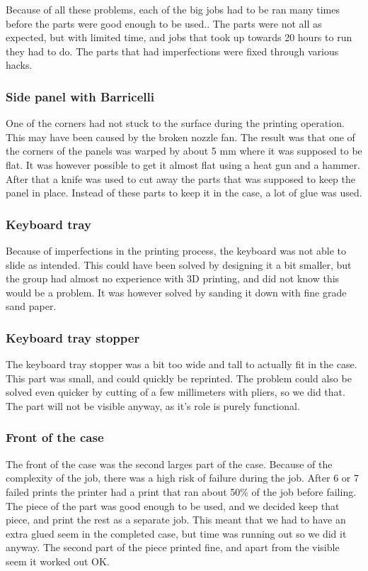 Because of all these problems, each of the big jobs had to be ran many times before the parts were good enough to be used..
The parts were not all as expected, but with limited time, and jobs that took up towards 20 hours to run they had to do.
The parts that had imperfections were fixed through various hacks.

\subsubsection*{Side panel with Barricelli}
One of the corners had not stuck to the surface during the printing operation.
This may have been caused by the broken nozzle fan.
The result was that one of the corners of the panels was warped by about 5 mm where it was supposed to be flat.
It was however possible to get it almost flat using a heat gun and a hammer.
After that a knife was used to cut away the parts that was supposed to keep the panel in place.
Instead of these parts to keep it in the case, a lot of glue was used.

\subsubsection*{Keyboard tray}
Because of imperfections in the printing process, the keyboard was not able to slide as intended.
This could have been solved by designing it a bit smaller, but the group had almost no experience with 3D printing, and did not know this would be a problem.
It was however solved by sanding it down with fine grade sand paper.

\subsubsection*{Keyboard tray stopper}
The keyboard tray stopper was a bit too wide and tall to actually fit in the case.
This part was small, and could quickly be reprinted.
The problem could also be solved even quicker by cutting of a few millimeters with pliers, so we did that.
The part will not be visible anyway, as it's role is purely functional.

\subsubsection*{Front of the case}
The front of the case was the second larges part of the case.
Because of the complexity of the job, there was a high risk of failure during the job.
After 6 or 7 failed prints the printer had a print that ran about 50\% of the job before failing.
The piece of the part was good enough to be used, and we decided keep that piece, and print the rest as a separate job.
This meant that we had to have an extra glued seem in the completed case, but time was running out so we did it anyway.
The second part of the piece printed fine, and apart from the visible seem it worked out OK.

